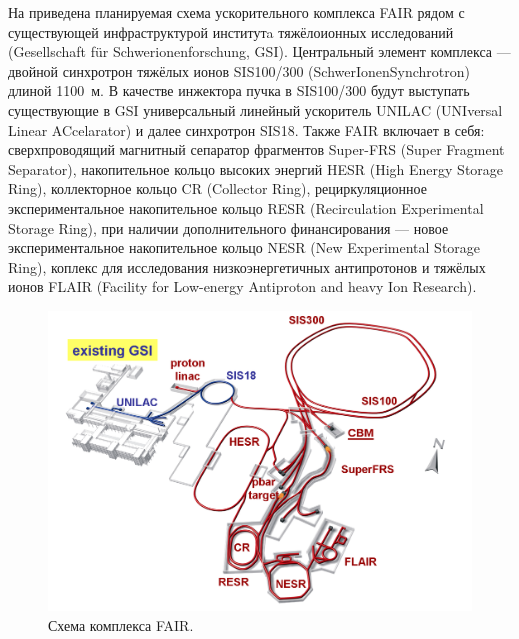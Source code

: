 На  приведена планируемая схема ускорительного комплекса FAIR рядом с существующей инфраструктурой институтa тяжёлоионных исследований (Gesellschaft f\"{u}r Schwerionenforschung, GSI).
Центральный элемент комплекса --- двойной синхротрон тяжёлых ионов SIS100/300 (SchwerIonenSynchrotron) длиной 1100~м. В качестве инжектора пучка в SIS100/300 будут выступать существующие в GSI универсальный линейный ускоритель UNILAC (UNIversal Linear ACcelarator) и далее синхротрон SIS18.
Также FAIR включает в себя:
сверхпроводящий магнитный сепаратор фрагментов Super-FRS (Super Fragment Separator),
накопительное кольцо высоких энергий HESR (High Energy Storage Ring),
коллекторное кольцо CR (Collector Ring),
рециркуляционное экспериментальное накопительное кольцо RESR (Recirculation Experimental Storage Ring), 
при наличии дополнительного финансирования --- новое экспериментальное накопительное кольцо NESR (New Experimental Storage Ring),
коплекс для исследования низкоэнергетичных антипротонов и тяжёлых ионов FLAIR (Facility for Low-energy Antiproton and heavy Ion Research).

\begin{figure}[H]
\includegraphics[width=1.0\textwidth]{pictures/FAIR_structure.png}
\caption{Схема комплекса FAIR.}
\label{fig:FAIRstructure}
\end{figure}

